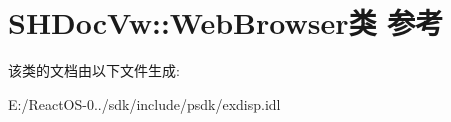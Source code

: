 \hypertarget{class_s_h_doc_vw_1_1_web_browser}{}\section{S\+H\+Doc\+Vw\+:\+:Web\+Browser类 参考}
\label{class_s_h_doc_vw_1_1_web_browser}


该类的文档由以下文件生成\+:\begin{DoxyCompactItemize}
\item 
E\+:/\+React\+O\+S-\/0../sdk/include/psdk/exdisp.\+idl\end{DoxyCompactItemize}
